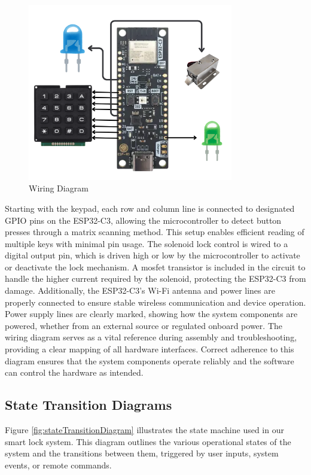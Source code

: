 \begin{figure}[ht]
    \centering
    \includegraphics[width=0.80\textwidth]{img/wiringDiagram.png}
    \caption{Wiring Diagram}
    \label{fig:wiringDiagram}
\end{figure}

Starting with the keypad, each row and column line is connected to designated GPIO pins on the ESP32-C3, allowing the microcontroller to detect button presses through a matrix scanning method. This setup enables efficient reading of multiple keys with minimal pin usage. The solenoid lock control is wired to a digital output pin, which is driven high or low by the microcontroller to activate or deactivate the lock mechanism. A mosfet transistor is included in the circuit to handle the higher current required by the solenoid, protecting the ESP32-C3 from damage. Additionally, the ESP32-C3’s Wi-Fi antenna and power lines are properly connected to ensure stable wireless communication and device operation. Power supply lines are clearly marked, showing how the system components are powered, whether from an external source or regulated onboard power. The wiring diagram serves as a vital reference during assembly and troubleshooting, providing a clear mapping of all hardware interfaces. Correct adherence to this diagram ensures that the system components operate reliably and the software can control the hardware as intended.

\subsection{State Transition Diagrams}
Figure \ref{fig:stateTransitionDiagram} illustrates the state machine used in our smart lock system. This diagram outlines the various operational states of the system and the transitions between them, triggered by user inputs, system events, or remote commands.

